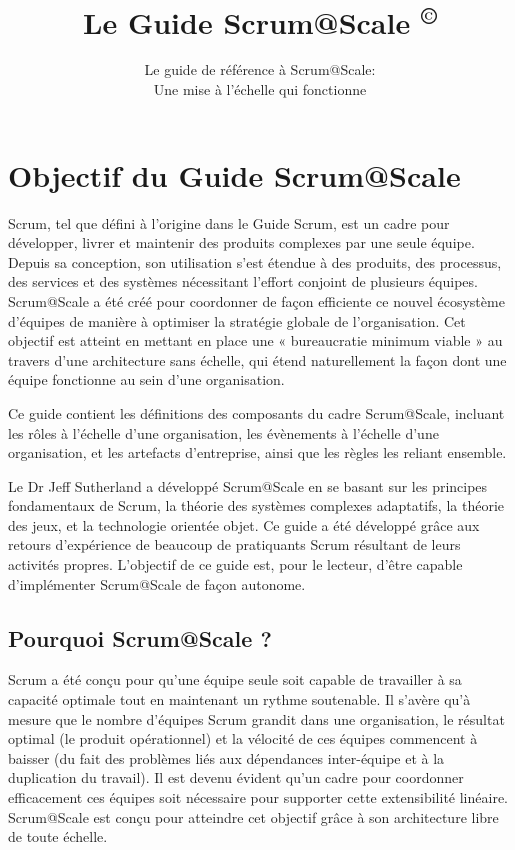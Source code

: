 \documentclass[12pt,a4paper,parskip=full]{scrartcl}
\title{\Huge{\color{red}\textbf{Le Guide Scrum@Scale
\textsuperscript{\copyright}}}}
\subtitle{\color{gray}Le guide de référence à Scrum@Scale:\\ Une mise à l'échelle qui fonctionne}
\date{}
\begin{document}

\section{Objectif du Guide Scrum@Scale}
Scrum, tel que défini à l’origine dans le Guide Scrum, est un cadre pour développer, livrer
et maintenir des produits complexes par une seule équipe. Depuis sa conception, son
utilisation s’est étendue à des produits, des processus, des services et des systèmes
nécessitant l’effort conjoint de plusieurs équipes. Scrum@Scale a été créé pour
coordonner de façon efficiente ce nouvel écosystème d’équipes de manière à optimiser la
stratégie globale de l’organisation. Cet objectif est atteint en mettant en place une
« bureaucratie minimum viable » au travers d’une architecture sans échelle, qui étend
naturellement la façon dont une équipe fonctionne au sein d’une organisation.

Ce guide contient les définitions des composants du cadre Scrum@Scale, incluant les
rôles à l’échelle d’une organisation, les évènements à l’échelle d’une organisation, et les
artefacts d’entreprise, ainsi que les règles les reliant ensemble.

Le Dr Jeff Sutherland a développé Scrum@Scale en se basant sur les principes
fondamentaux de Scrum, la théorie des systèmes complexes adaptatifs, la théorie des
jeux, et la technologie orientée objet. Ce guide a été développé grâce aux retours
d’expérience de beaucoup de pratiquants Scrum résultant de leurs activités propres.
L’objectif de ce guide est, pour le lecteur, d’être capable d’implémenter Scrum@Scale de
façon autonome.

\subsection{Pourquoi Scrum@Scale ?}
Scrum a été conçu pour qu’une équipe seule soit capable de travailler à sa capacité
optimale tout en maintenant un rythme soutenable. Il s’avère qu’à mesure que le nombre
d’équipes Scrum grandit dans une organisation, le résultat optimal (le produit opérationnel)
et la vélocité de ces équipes commencent à baisser (du fait des problèmes liés aux
dépendances inter-équipe et à la duplication du travail). Il est devenu évident qu’un cadre
pour coordonner efficacement ces équipes soit nécessaire pour supporter cette
extensibilité linéaire. Scrum@Scale est conçu pour atteindre cet objectif grâce à son
architecture libre de toute échelle.
\end{document}
